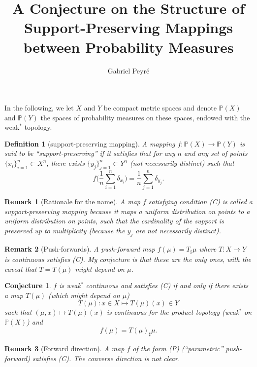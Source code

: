\documentclass{article}
\title{A Conjecture on the Structure of Support-Preserving Mappings \\ between Probability Measures}
\author{Gabriel Peyré}
\newtheorem{remark}{Remark}
\newtheorem{defn}{Definition}
\newtheorem{conjecture}{Conjecture}
\begin{document}
\maketitle


In the following, we let \( X \) and \( Y \) be compact metric spaces and denote $\mathbb{P}(X)$ and $\mathbb{P}(Y)$ the spaces of probability measures on these spaces, endowed with the weak$^*$ topology.

\begin{defn}[support-preserving mapping]
A mapping \( f : \mathbb{P}(X) \to \mathbb{P}(Y) \) is said to be ``support-preserving'' if it satisfies that for any $n$ and any set of points $\{x_i\}_{i=1}^n \subset X^n$, there exists $\{y_j\}_{j=1}^n \subset Y^n$ (not necessarily distinct) such that 
\[
f\Big( \frac{1}{n} \sum_{i=1}^n \delta_{x_i} \Big) = \frac{1}{n} \sum_{j=1}^n \delta_{y_j}.  \tag{S}
\]
\end{defn}

\begin{remark}[Rationale for the name]
A map \( f \) satisfying condition (C) is called a \textit{support-preserving mapping} because it maps a uniform distribution on points to a uniform distribution on points, such that the cardinality of the support is preserved up to multiplicity (because the $y_j$ are not necessarily distinct). 
\end{remark}

\begin{remark}[Push-forwards]
A push-forward map \( f(\mu) = T_{\sharp} \mu \) where \( T : X \to Y \) is continuous satisfies (C). My conjecture is that these are the only ones, with the caveat that \( T = T(\mu) \) might  depend on \( \mu \).
\end{remark}

\begin{conjecture}
\( f \) is weak\(^*\) continuous and satisfies (C) if and only if there exists a map \( T(\mu) \) (which might depend on \( \mu \))
\[
T(\mu) : x \in X \mapsto T(\mu)(x) \in Y
\]
such that \( (\mu, x) \mapsto T(\mu)(x) \) is continuous for the product topology (weak\(^*\) on \( \mathbb{P}(X) \)) and
\[
f(\mu) = T(\mu)_{\sharp} \mu. \tag{P}
\]
\end{conjecture}

\begin{remark}[Forward direction]
A map $f$ of the form (P) (``parametric'' push-forward) satisfies (C). The converse direction is not clear.
\end{remark}
\end{document}
